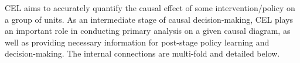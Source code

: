 \acrshort{CEL} aims to accurately quantify the causal effect of some intervention/policy on a group of units. As an intermediate stage of causal decision-making, \acrshort{CEL} plays an important role in conducting primary analysis on a given causal diagram, as well as providing necessary information for post-stage policy learning and decision-making. The internal connections are multi-fold and detailed below.


\begin{comment}
\textbf{\acrshort{CEL} offers increased flexibility in modeling given a causal structure.} When expert knowledge is not enough to establish a definitive causal diagram, \acrshort{CSL} becomes attractive in being able to combine causal discovery and causal effect estimation under the identified causal structure \citep{cai2020anoce}. While it is powerful to kill two birds with one stone, this approach may be constrained by model assumptions, such as those inherent in a linear structural equation model. Conversely, when a causal diagram is already known, either derived from data or expert knowledge, \acrshort{CEL} becomes more adaptable in handling estimation and inference under both causal structure modeling and potential outcome framework. For example, existing work in \acrshort{ATE},  \acrshort{HTE} and mediation effect estimation span both parametric and semi-parametric settings \citep{chernozhukov2018double,kunzel2019metalearners}, with versatile extensions capable of handling assumption violations like unmeasured confounders \citep{wang2018bounded}, interference \citep{savje2021average}, and more. This renders \acrshort{CEL} a more comprehensive and versatile way of evaluating the causal effects of interest.


\textbf{As a downstream task of CSL,  \acrshort{CEL} exhibits adaptability to more general data structures.} Existing work in \acrshort{CEL} encompasses diverse data structures, including but not limited to single-stage, multi-stage dynamic treatment regimes, and infinite-horizon Markov decision processes. Depending on intervention strategies (i.e. experimental design or observational study), an extensive body of literature exists, offering methodologies for handling \acrshort{ATE} \citep{zhang2013robust, chernozhukov2018double},  \acrshort{HTE} \citep{kunzel2019metalearners, nie2021quasi, kennedy2020optimal, van2006statistical, lee2017doubly, athey2019generalized, shi2019adapting}, and mediation effect estimations \citep{hicks2011causal, hong2010ratio, imai2010general, pearl2022direct, tchetgen2012semiparametric}. 

\end{comment}
